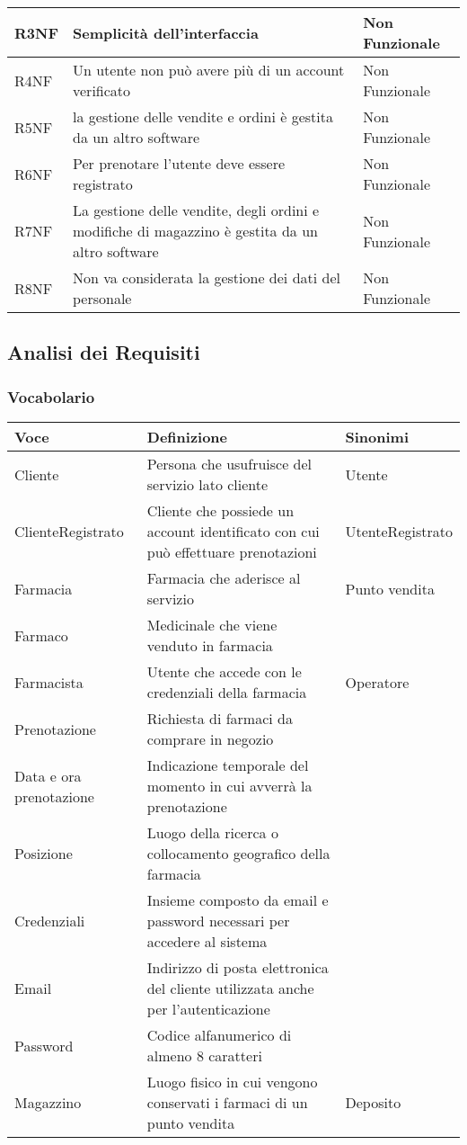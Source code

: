 \begin{tabular} {|P{1.5cm}|P{12.5cm}|P{3cm}|}
\hline
  R3NF & Semplicità dell'interfaccia & Non Funzionale\\
\hline
  R4NF & Un utente non può avere più di un account verificato & Non Funzionale\\
\hline
  R5NF & la gestione delle vendite e ordini è gestita da un altro software & Non Funzionale\\
\hline
  R6NF & Per prenotare l'utente deve essere registrato & Non Funzionale\\
\hline
  R7NF & La gestione delle vendite, degli ordini e modifiche di magazzino è gestita da un altro software & Non Funzionale\\
\hline
  R8NF & Non va considerata la gestione dei dati del personale & Non Funzionale \\
\hline
\end{tabular}

\subsection{Analisi dei Requisiti}
\subsubsection{Vocabolario}

\begin{tabular} {|P{3.5cm}|P{10.5cm}|P{3cm}|}
\hline
  \textbf{Voce} & \textbf{Definizione} & \textbf{Sinonimi}\\
\hline
  Cliente & Persona che usufruisce del servizio lato cliente & Utente \\
\hline
  ClienteRegistrato & Cliente che possiede un account identificato con cui può effettuare prenotazioni & UtenteRegistrato \\
\hline
  Farmacia & Farmacia che aderisce al servizio & Punto vendita\\
\hline
  Farmaco & Medicinale che viene venduto in farmacia & \\
\hline
  Farmacista & Utente che accede con le credenziali della farmacia & Operatore \\
\hline
  Prenotazione & Richiesta di farmaci da comprare in negozio & \\
\hline
  Data e ora prenotazione & Indicazione temporale del momento in cui avverrà la prenotazione & \\
\hline
  Posizione & Luogo della ricerca o collocamento geografico della farmacia & \\
\hline
  Credenziali & Insieme composto da email e password necessari per accedere al sistema&\\
\hline
  Email & Indirizzo di posta elettronica del cliente utilizzata anche per l'autenticazione &\\
\hline
  Password & Codice alfanumerico di almeno 8 caratteri &\\
\hline
  Magazzino & Luogo fisico in cui vengono conservati i farmaci di un punto vendita & Deposito \\
\hline
\end{tabular}

